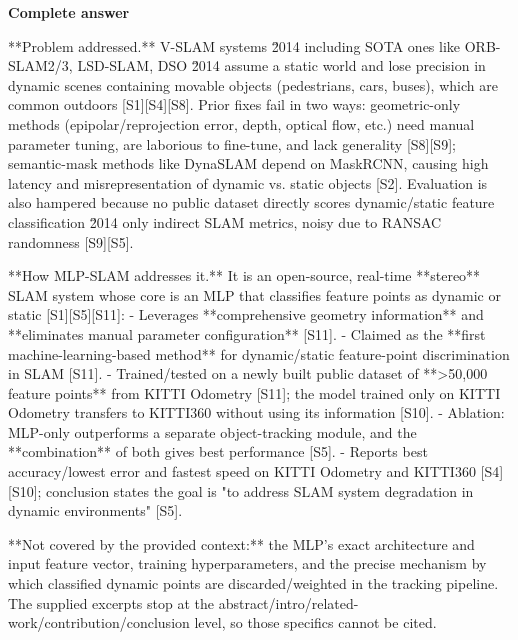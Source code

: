 \documentclass[10pt]{article}
\begin{document}
\textbf{Complete answer}
\begin{AnswerText}
**Problem addressed.** V-SLAM systems \u2014 including SOTA ones like ORB-SLAM2/3, LSD-SLAM, DSO \u2014 assume a static world and lose precision in dynamic scenes containing movable objects (pedestrians, cars, buses), which are common outdoors [S1][S4][S8]. Prior fixes fail in two ways: geometric-only methods (epipolar/reprojection error, depth, optical flow, etc.) need manual parameter tuning, are laborious to fine-tune, and lack generality [S8][S9]; semantic-mask methods like DynaSLAM depend on MaskRCNN, causing high latency and misrepresentation of dynamic vs. static objects [S2]. Evaluation is also hampered because no public dataset directly scores dynamic/static feature classification \u2014 only indirect SLAM metrics, noisy due to RANSAC randomness [S9][S5].

**How MLP-SLAM addresses it.** It is an open-source, real-time **stereo** SLAM system whose core is an MLP that classifies feature points as dynamic or static [S1][S5][S11]:
- Leverages **comprehensive geometry information** and **eliminates manual parameter configuration** [S11].
- Claimed as the **first machine-learning-based method** for dynamic/static feature-point discrimination in SLAM [S11].
- Trained/tested on a newly built public dataset of **>50,000 feature points** from KITTI Odometry [S11]; the model trained only on KITTI Odometry transfers to KITTI360 without using its information [S10].
- Ablation: MLP-only outperforms a separate object-tracking module, and the **combination** of both gives best performance [S5].
- Reports best accuracy/lowest error and fastest speed on KITTI Odometry and KITTI360 [S4][S10]; conclusion states the goal is "to address SLAM system degradation in dynamic environments" [S5].

**Not covered by the provided context:** the MLP's exact architecture and input feature vector, training hyperparameters, and the precise mechanism by which classified dynamic points are discarded/weighted in the tracking pipeline. The supplied excerpts stop at the abstract/intro/related-work/contribution/conclusion level, so those specifics cannot be cited.
\end{AnswerText}
\end{document}
